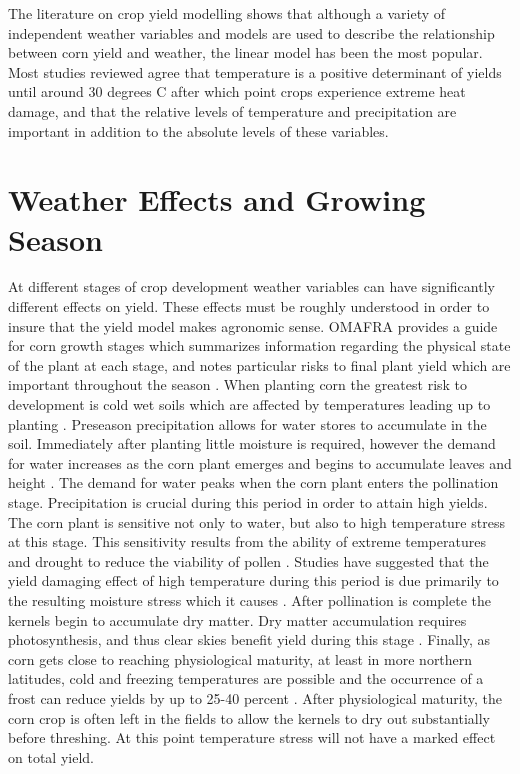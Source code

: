 The literature on crop yield modelling shows that although a variety of independent weather variables and models are used to describe the relationship between corn yield and weather, the linear model has been the most popular. Most studies reviewed agree that temperature is a positive determinant of yields until around 30 degrees C after which point crops experience extreme heat damage, and that the relative levels of temperature and precipitation are important in addition to the absolute levels of these variables.



\section{Weather Effects and Growing Season}

At different stages of crop development weather variables can have significantly different effects on yield. These effects must be roughly understood in order to insure that the yield model makes agronomic sense. OMAFRA provides a guide for corn growth stages which summarizes information regarding the physical state of the plant at each stage, and notes particular risks to final plant yield which are important throughout the season \citep{OMAFRA}. When planting corn the greatest risk to development is cold wet soils which are affected by temperatures leading up to planting \citep{neild1987growing}. Preseason precipitation allows for water stores to accumulate in the soil. Immediately after planting little moisture is required, however the demand for water increases as the corn plant emerges and begins to accumulate leaves and height \citep{neild1987growing, OMAFRA}. The demand for water peaks when the corn plant enters the pollination stage. Precipitation is crucial during this period in order to attain high yields. The corn plant is sensitive not only to water, but also to high temperature stress at this stage. This sensitivity results from the ability of extreme temperatures and drought to reduce the viability of pollen \citep{OMAFRA}. Studies have suggested that the yield damaging effect of high temperature during this period is due primarily to the resulting moisture stress which it causes \citep{williams2016soil}. After pollination is complete the kernels begin to accumulate dry matter. Dry matter accumulation requires photosynthesis, and thus clear skies benefit yield during this stage \citep{OMAFRA}. Finally, as corn gets close to reaching physiological maturity, at least in more northern latitudes, cold and freezing temperatures are possible and the occurrence of a frost can reduce yields by up to 25-40 percent \citep{OMAFRA}. After physiological maturity, the corn crop is often left in the fields to allow the kernels to dry out substantially before threshing. At this point temperature stress will not have a marked effect on total yield.

